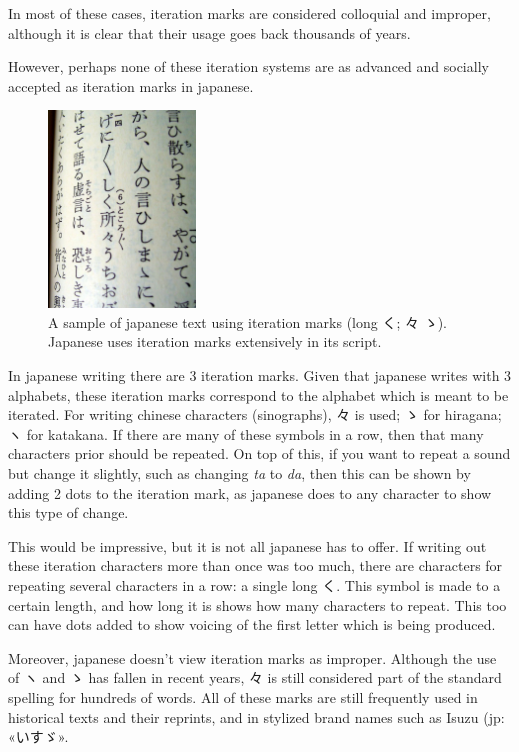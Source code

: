 \documentclass{article}
\begin{document}
In most of these cases, iteration marks are considered colloquial and improper,
although it is clear that their usage goes back thousands of years.

However, perhaps none of these iteration systems are as advanced and socially
accepted as iteration marks in japanese.

\begin{figure}
  \begin{center}
    \includegraphics[width=0.35\textwidth]{tsuredzuregusa}
  \end{center}
  \caption{A sample of japanese text using iteration marks (long く; 々 ゝ).
  Japanese uses iteration marks extensively in its script.}
\end{figure}

In japanese writing there are 3 iteration marks. Given that japanese writes with
3 alphabets, these iteration marks correspond to the alphabet which is meant to
be iterated. For writing chinese characters (sinographs), 々 is used; ゝ for
hiragana; ヽ for katakana. If there are many of these symbols in a row, then
that many characters prior should be repeated. On top of this, if you want to
repeat a sound but change it slightly, such as changing \textit{ta} to
\textit{da}, then this can be shown by adding 2 dots to the iteration mark, as
japanese does to any character to show this type of change.

This would be impressive, but it is not all japanese has to offer. If writing
out these iteration characters more than once was too much, there are characters
for repeating several characters in a row: a single long く. This symbol is made
to a certain length, and how long it is shows how many characters to repeat.
This too can have dots added to show voicing of the first letter which is being
produced.

Moreover, japanese doesn't view iteration marks as improper. Although the use of
ヽ and ゝ has fallen in recent years, 々 is still considered part of the
standard spelling for hundreds of words. All of these marks are still frequently
used in historical texts and their reprints, and in stylized brand names such as
Isuzu (jp: «いすゞ».
\end{document}

